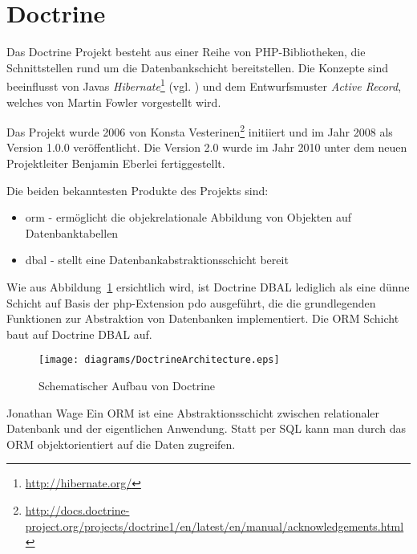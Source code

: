 \section{Doctrine}
Das Doctrine Projekt besteht aus einer Reihe von PHP-Bibliotheken, die Schnittstellen rund um die Datenbankschicht bereitstellen. Die Konzepte sind beeinflusst von Javas \textit{Hibernate}\footnote{\url{http://hibernate.org/}} (vgl. \cite{web:t3nDoctrine2009}) und dem Entwurfsmuster \textit{Active Record}, welches von Martin Fowler \cite{book:fowlerPatterns2003} vorgestellt wird.

Das Projekt wurde 2006 von Konsta Vesterinen\footnote{\url{http://docs.doctrine-project.org/projects/doctrine1/en/latest/en/manual/acknowledgements.html}} initiiert und im Jahr 2008 als Version 1.0.0 veröffentlicht. Die Version 2.0 wurde im Jahr 2010 unter dem neuen Projektleiter Benjamin Eberlei fertiggestellt.

Die beiden bekanntesten Produkte des Projekts sind:
\begin{itemize}
	\item \gls{orm} - ermöglicht die objekrelationale Abbildung von Objekten auf Datenbanktabellen
	\item \gls{dbal} - stellt eine Datenbankabstraktionsschicht bereit
\end{itemize}

Wie aus Abbildung~\ref{fig:doctrineArchitecture} ersichtlich wird, ist Doctrine DBAL lediglich als eine dünne Schicht auf Basis der \gls{php}-Extension \gls{pdo} ausgeführt, die die grundlegenden Funktionen zur Abstraktion von Datenbanken implementiert. Die ORM Schicht baut auf Doctrine DBAL auf.

\begin{figure}[H]
    \centering
    \texttt{[image: diagrams/DoctrineArchitecture.eps]}
    \caption{Schematischer Aufbau von Doctrine}
    \label{fig:doctrineArchitecture}
\end{figure}

\begin{shadequote}[l]{Jonathan Wage \cite{web:t3nDoctrine2009}}
	Ein ORM ist eine Abstraktionsschicht zwischen relationaler Datenbank und der eigentlichen Anwendung. Statt per SQL kann man durch das ORM objektorientiert auf die Daten zugreifen.
\end{shadequote}

